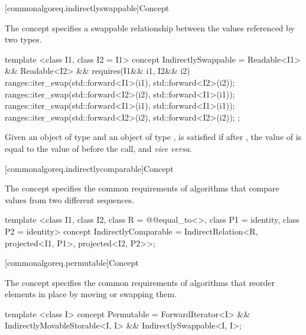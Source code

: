 [commonalgoreq.indirectlyswappable]{Concept }

\pnum
The  concept specifies a swappable relationship between the
values referenced by two  types.

%
\begin{codeblock}
  template <class I1, class I2 = I1>
  concept IndirectlySwappable =
    Readable<I1> && Readable<I2> &&
    requires(I1&& i1, I2&& i2) {
      ranges::iter_swap(std::forward<I1>(i1), std::forward<I2>(i2));
      ranges::iter_swap(std::forward<I2>(i2), std::forward<I1>(i1));
      ranges::iter_swap(std::forward<I1>(i1), std::forward<I1>(i1));
      ranges::iter_swap(std::forward<I2>(i2), std::forward<I2>(i2));
    };
\end{codeblock}

\pnum
Given an object  of type  and an object  of
type ,  is satisfied if after
, the value of  is equal to the
value of  before the call, and \textit{vice versa}.

[commonalgoreq.indirectlycomparable]{Concept }

\pnum
The  concept specifies the common requirements of algorithms that
compare values from two different sequences.

%
\begin{codeblock}
  template <class I1, class I2, class R = @@equal_to<>, class P1 = identity,
    class P2 = identity>
  concept IndirectlyComparable =
    IndirectRelation<R, projected<I1, P1>, projected<I2, P2>>;
\end{codeblock}

[commonalgoreq.permutable]{Concept }

\pnum
The  concept specifies the common requirements of algorithms that reorder
elements in place by moving or swapping them.

%
\begin{codeblock}
  template <class I>
  concept Permutable =
    ForwardIterator<I> &&
    IndirectlyMovableStorable<I, I> &&
    IndirectlySwappable<I, I>;
\end{codeblock}

